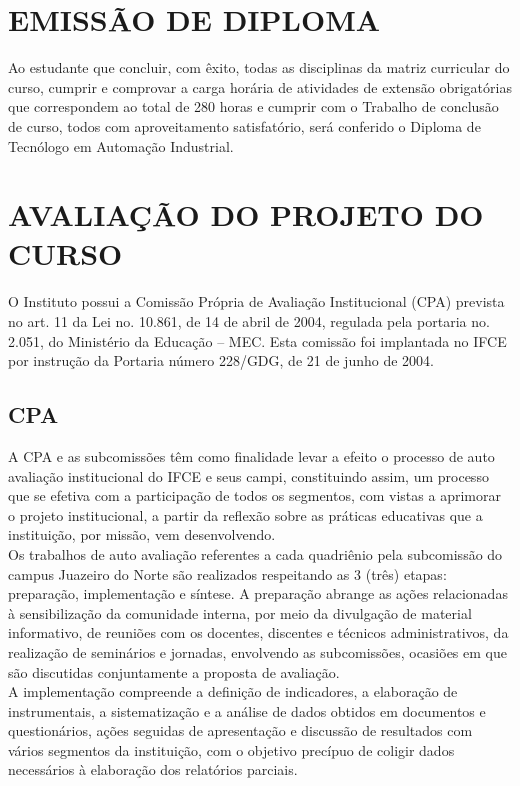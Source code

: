 \chapter{EMISSÃO DE DIPLOMA}

Ao estudante que concluir, com êxito, todas as disciplinas da matriz curricular do curso, cumprir e comprovar a carga horária de atividades de extensão obrigatórias que correspondem ao total de 280 horas e cumprir com o Trabalho de conclusão de curso, todos com aproveitamento satisfatório, será conferido o Diploma de Tecnólogo em Automação Industrial.\\

\chapter{AVALIAÇÃO DO PROJETO DO CURSO}

O Instituto possui a Comissão Própria de Avaliação Institucional (CPA) prevista no art. 11 da Lei no. 10.861, de 14 de abril de 2004, regulada pela portaria no. 2.051, do Ministério da Educação – MEC. Esta comissão foi implantada no IFCE por instrução da Portaria número 228/GDG, de 21 de junho de 2004.\\
\section{CPA}
A CPA e as subcomissões têm como finalidade levar a efeito o processo de auto avaliação institucional do IFCE e seus campi, constituindo assim, um processo que se efetiva com a participação de todos os segmentos, com vistas a aprimorar o projeto institucional, a partir da reflexão sobre as práticas educativas que a instituição, por missão, vem desenvolvendo.\\

Os trabalhos de auto avaliação referentes a cada quadriênio pela subcomissão do campus Juazeiro do Norte são realizados respeitando as 3 (três) etapas: preparação, implementação e síntese. A preparação abrange as ações relacionadas à sensibilização da comunidade interna, por meio da divulgação de material informativo, de reuniões com os docentes, discentes e técnicos administrativos, da realização de seminários e jornadas, envolvendo as subcomissões, ocasiões em que são discutidas conjuntamente a proposta de avaliação.\\

A implementação compreende a definição de indicadores, a elaboração de instrumentais, a sistematização e a análise de dados obtidos em documentos e questionários, ações seguidas de apresentação e discussão de resultados com vários segmentos da instituição, com o objetivo precípuo de coligir dados necessários à elaboração dos relatórios parciais.\\


